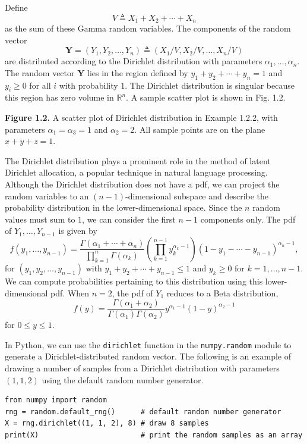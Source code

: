 Define
\[
V\triangleq X_1+X_2+\cdots +X_n
\]
as the sum of these Gamma random variables. The components of the random vector
\[
\mathbf{Y}=(Y_1,Y_2,\dots,Y_n)\triangleq (X_1/V,X_2/V,\dots,X_n/V)
\]
are distributed according to the Dirichlet distribution with parameters $\alpha_1,\dots,\alpha_n$. The random vector $\mathbf{Y}$ lies in the region defined by $y_1+y_2+\cdots +y_n=1$ and $y_i\ge 0$ for all $i$ with probability $1$. The Dirichlet distribution is singular because this region has zero volume in $\mathbb{R}^n$. A sample scatter plot is shown in Fig. 1.2.

\textbf{Figure 1.2.} A scatter plot of Dirichlet distribution in Example 1.2.2, with parameters $\alpha_1=\alpha_3=1$ and $\alpha_2=2$. All sample points are on the plane $x+y+z=1$.

The Dirichlet distribution plays a prominent role in the method of latent Dirichlet allocation, a popular technique in natural language processing. Although the Dirichlet distribution does not have a pdf, we can project the random variables to an $(n-1)$-dimensional subspace and describe the probability distribution in the lower-dimensional space. Since the $n$ random values must sum to $1$, we can consider the first $n-1$ components only. The pdf of $Y_1,\dots,Y_{n-1}$ is given by
\begin{equation}
f(y_1,\dots,y_{n-1})
=
\frac{\Gamma(\alpha_1+\cdots +\alpha_n)}{\prod_{k=1}^{n}\Gamma(\alpha_k)}
\left(\prod_{k=1}^{n-1} y_k^{\alpha_k-1}\right)
(1-y_1-\cdots -y_{n-1})^{\alpha_n-1},
\tag{1.4}
\end{equation}
for $(y_1,y_2,\dots,y_{n-1})$ with $y_1+y_2+\cdots +y_{n-1}\le 1$ and $y_k\ge 0$ for $k=1,\dots,n-1$. We can compute probabilities pertaining to this distribution using this lower-dimensional pdf. When $n=2$, the pdf of $Y_1$ reduces to a Beta distribution,
\[
f(y)=
\frac{\Gamma(\alpha_1+\alpha_2)}{\Gamma(\alpha_1)\Gamma(\alpha_2)}
y^{\alpha_1-1}(1-y)^{\alpha_2-1}
\]
for $0\le y\le 1$.

In Python, we can use the \texttt{dirichlet} function in the \texttt{numpy.random} module to generate a Dirichlet-distributed random vector. The following is an example of drawing a number of samples from a Dirichlet distribution with parameters $(1,1,2)$ using the default random number generator.
\begin{verbatim}
from numpy import random
rng = random.default_rng()      # default random number generator
X = rng.dirichlet((1, 1, 2), 8) # draw 8 samples
print(X)                        # print the random samples as an array
\end{verbatim}

